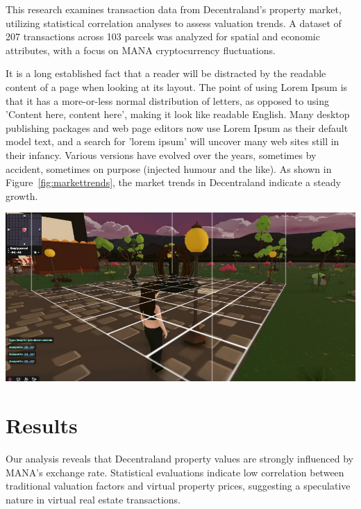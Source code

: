 \documentclass[a4paper]{article}
\begin{document}
\begin{multicols}{2}
This research examines transaction data from Decentraland's property market, utilizing statistical correlation analyses to assess valuation trends. A dataset of 207 transactions across 103 parcels was analyzed for spatial and economic attributes, with a focus on MANA cryptocurrency fluctuations.

It is a long established fact that a reader will be distracted by the readable content of a page when looking at its layout. The point of using Lorem Ipsum is that it has a more-or-less normal distribution of letters, as opposed to using 'Content here, content here', making it look like readable English. Many desktop publishing packages and web page editors now use Lorem Ipsum as their default model text, and a search for 'lorem ipsum' will uncover many web sites still in their infancy. Various versions have evolved over the years, sometimes by accident, sometimes on purpose (injected humour and the like). As shown in Figure~\ref{fig:markettrends}, the market trends in Decentraland indicate a steady growth.

\noindent
\begin{minipage}{\columnwidth}
\centering
\includegraphics[width=1\textwidth]{image.jpg}
\label{fig:markettrends} %
\end{minipage}

\section{Results}
Our analysis reveals that Decentraland property values are strongly influenced by MANA’s exchange rate. Statistical evaluations indicate low correlation between traditional valuation factors and virtual property prices, suggesting a speculative nature in virtual real estate transactions.


\end{multicols}
\end{document}
